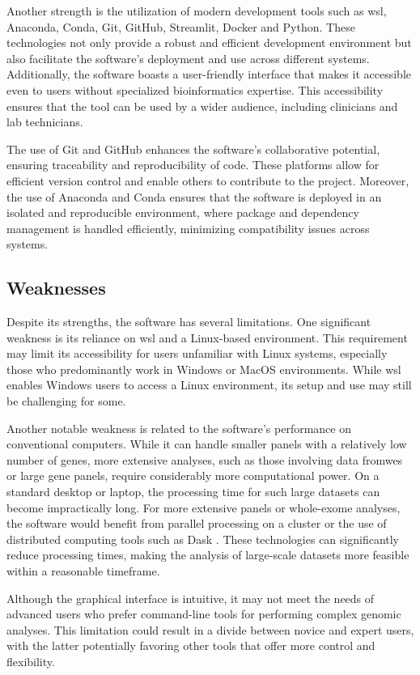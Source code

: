 Another strength is the utilization of modern development tools such as \ac{wsl}, Anaconda, Conda, Git, GitHub, Streamlit, Docker and Python. These technologies not only provide a robust and efficient development environment but also facilitate the software's deployment and use across different systems. Additionally, the software boasts a user-friendly interface that makes it accessible even to users without specialized bioinformatics expertise. This accessibility ensures that the tool can be used by a wider audience, including clinicians and lab technicians.

The use of Git and GitHub enhances the software's collaborative potential, ensuring traceability and reproducibility of code. These platforms allow for efficient version control and enable others to contribute to the project. Moreover, the use of Anaconda and Conda ensures that the software is deployed in an isolated and reproducible environment, where package and dependency management is handled efficiently, minimizing compatibility issues across systems.

\subsection{Weaknesses}

Despite its strengths, the software has several limitations. One significant weakness is its reliance on \ac{wsl} and a Linux-based environment. This requirement may limit its accessibility for users unfamiliar with Linux systems, especially those who predominantly work in Windows or MacOS environments. While \ac{wsl} enables Windows users to access a Linux environment, its setup and use may still be challenging for some.

Another notable weakness is related to the software's performance on conventional computers. While it can handle smaller panels with a relatively low number of genes, more extensive analyses, such as those involving data from\ac{wes} or large gene panels, require considerably more computational power. On a standard desktop or laptop, the processing time for such large datasets can become impractically long. For more extensive panels or whole-exome analyses, the software would benefit from parallel processing on a cluster or the use of distributed computing tools such as Dask \cite{dask}. These technologies can significantly reduce processing times, making the analysis of large-scale datasets more feasible within a reasonable timeframe.

Although the graphical interface is intuitive, it may not meet the needs of advanced users who prefer command-line tools for performing complex genomic analyses. This limitation could result in a divide between novice and expert users, with the latter potentially favoring other tools that offer more control and flexibility.

